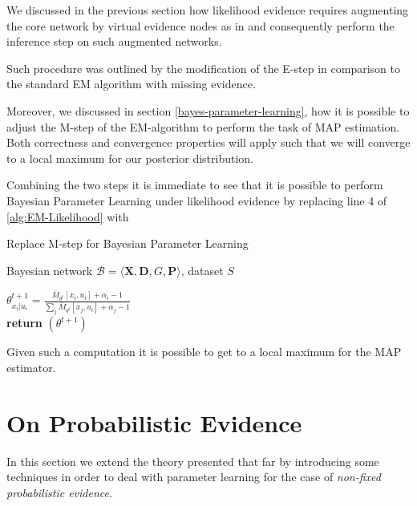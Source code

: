 \documentclass[11pt]{article}
\begin{document}
\begin{article}
We discussed in the previous section how likelihood evidence
requires augmenting the core network by virtual evidence nodes as
in \cite{pearl2014probabilistic} and consequently perform the
inference step on such augmented networks.

Such procedure was outlined by the modification of the E-step in
comparison to the standard EM algorithm with missing evidence.

Moreover, we discussed in section \ref{bayes-parameter-learning}, how
it is possible to adjust the M-step of the EM-algorithm to perform
the task of MAP estimation. Both correctness and convergence
properties will apply such that we will converge to a local maximum
for our posterior distribution.

Combining the two steps it is immediate to see that it is possible
to perform Bayesian Parameter Learning under likelihood evidence
by replacing line 4 of \ref{alg:EM-Likelihood} with 

\begin{algorithm*}[h!]
\caption{Replace M-step for Bayesian Parameter Learning}
\label{alg:Bayes-EM-Likelihood}
\vspace{-10pt}
\begin{multicols}{2}
\begin{algorithmic}[1] 
\Require Bayesian network $\mathcal{B}=\langle \mathbf{X},\mathbf{D}, G, \mathbf{P} \rangle$, dataset $S$ 

   \State $\theta_{x_{i}|u_{i}}^{t+1}=\frac{\bar{M}_{\theta^{t}}[x_{i},u_{i}] + \alpha_i - 1}{\sum_j \bar{M}_{\theta^{t}}[x_{j},u_{i}] + \alpha_j - 1}$\\
   
   \textbf{return} $(\theta^{t+1})$

\end{algorithmic}
\end{multicols}
\end{algorithm*}

Given such a computation it is possible to get to a local maximum
for the MAP estimator.

\newpage

\section{On Probabilistic Evidence}
\label{probabilistic-em}
In this section we extend the theory presented that far by
introducing some techniques in order to deal with parameter learning
for the case of \emph{non-fixed probabilistic evidence}.


\end{article}
\end{document}
